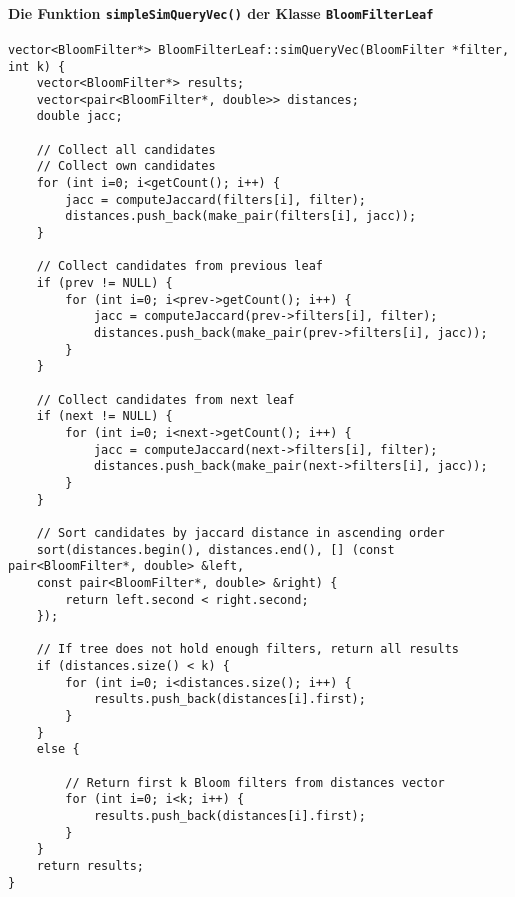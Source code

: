 \paragraph*{Die Funktion \texttt{simpleSimQueryVec()} der Klasse \texttt{BloomFilterLeaf}}
\small{
\begin{verbatim}
vector<BloomFilter*> BloomFilterLeaf::simQueryVec(BloomFilter *filter, int k) {
    vector<BloomFilter*> results;
    vector<pair<BloomFilter*, double>> distances;
    double jacc;
    
    // Collect all candidates
    // Collect own candidates
    for (int i=0; i<getCount(); i++) {
        jacc = computeJaccard(filters[i], filter);
        distances.push_back(make_pair(filters[i], jacc));
    }
    
    // Collect candidates from previous leaf
    if (prev != NULL) {
        for (int i=0; i<prev->getCount(); i++) {
            jacc = computeJaccard(prev->filters[i], filter);
            distances.push_back(make_pair(prev->filters[i], jacc));
        }
    }
    
    // Collect candidates from next leaf
    if (next != NULL) {
        for (int i=0; i<next->getCount(); i++) {
            jacc = computeJaccard(next->filters[i], filter);
            distances.push_back(make_pair(next->filters[i], jacc));
        }
    }
    
    // Sort candidates by jaccard distance in ascending order
    sort(distances.begin(), distances.end(), [] (const pair<BloomFilter*, double> &left, 
    const pair<BloomFilter*, double> &right) {
        return left.second < right.second;
    });
    
    // If tree does not hold enough filters, return all results
    if (distances.size() < k) {
        for (int i=0; i<distances.size(); i++) {
            results.push_back(distances[i].first);
        }
    }
    else {
        
        // Return first k Bloom filters from distances vector
        for (int i=0; i<k; i++) {
            results.push_back(distances[i].first);
        }
    }
    return results;
}
\end{verbatim}
}